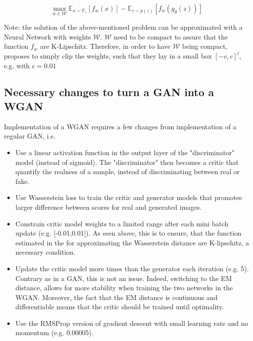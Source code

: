 \documentclass[11pt,a4paper,twoside]{report}
\begin{document}
\begin{equation}
    \max_{w \in \mathcal{W}}  \mathbb{E}_{x \sim \mathbb{P}_r}[f_w(x)] - \mathbb{E}_{z \sim p(z)}[f_w(g_{\theta}(z))]
\end{equation}

Note: the solution of the above-mentioned problem can be approximated with a Neural Network with weights $\mathcal{W}$. $\mathcal{W}$ need to be compact to assure that the function $f_w$ are K-Lipschitz. Therefore, in order to have $\mathcal{W}$ being compact, \cite{arjovsky2017wasserstein} proposes to simply clip the weights, such that they lay in a small box $[-c, c]^l$, e.g. with $c = 0.01$

\subsection{Necessary changes to turn a GAN into a WGAN}

Implementation of a WGAN requires a few changes from implementation of a regular GAN, i.e. 

\begin{itemize}
    \item Use a linear activation function in the output layer of the "discriminator" model (instead of sigmoid). The "discriminator" then becomes a critic that quantify the realness of a sample, instead of discriminating between real or fake.
    \item Use Wasserstein loss to train the critic and generator models that promotes larger difference between scores for real and generated images. 
    \item Constrain critic model weights to a limited range after each mini batch update (e.g. [-0.01,0.01]). As seen above, this is to ensure, that the function estimated in the for approximating the Wasserstein distance are K-lipschitz, a necessary condition.
    \item Update the critic model more times than the generator each iteration (e.g. 5). Contrary as in a GAN, this is not an issue. Indeed, switching to the EM distance, allows for more stability when training the two networks in the WGAN. Moreover, the fact that the EM distance is continuous and differentiable means that the critic should be trained until optimality.
    \item Use the RMSProp version of gradient descent with small learning rate and no momentum (e.g. 0.00005).
    
\end{itemize}
\end{document}

